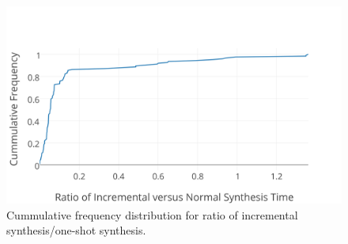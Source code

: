 \begin{figure}
	\includegraphics[width=\columnwidth]{figures/incremental-cdf.png}
	\caption{Cummulative frequency distribution for ratio of incremental synthesis/one-shot synthesis.}
	\label{fig:incremental-cdf}
\end{figure}





